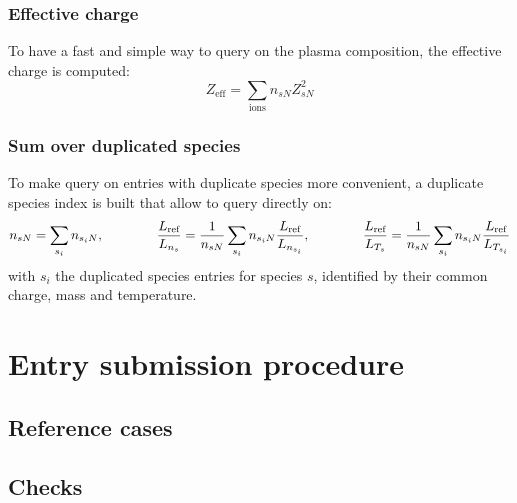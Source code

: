 \documentclass[a4paper]{report}
\begin{document}
\subsection{Effective charge}
To have a fast and simple way to query on the plasma composition, the effective charge is computed:
$$Z_\textrm{eff} = \sum_\textrm{ions} n_{sN}Z_{sN}^2$$ 

\subsection{Sum over duplicated species}
To make query on entries with duplicate species more convenient, a duplicate species index is built that allow to query directly on:
$$n_{sN}=\sum_{s_i}n_{s_iN}, \qquad \qquad \frac{L_{\textrm{ref}}}{L_{n_s}}=\frac{1}{n_{sN}}\sum_{s_i}n_{s_iN}\frac{L_{\textrm{ref}}}{L_{n_{s_i}}}, \qquad \qquad \frac{L_{\textrm{ref}}}{L_{T_s}}=\frac{1}{n_{sN}}\sum_{s_i}n_{s_iN}\frac{L_{\textrm{ref}}}{L_{T_{s_i}}}$$
with $s_i$ the duplicated species entries for species $s$, identified by their common charge, mass and temperature.


\chapter{Entry submission procedure}
\section{Reference cases}

\section{Checks}
\end{document}
